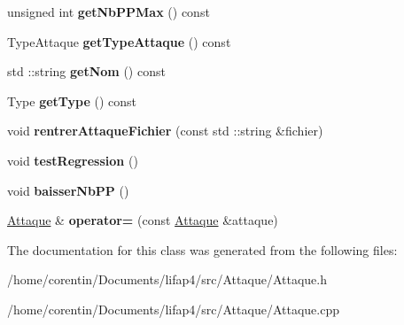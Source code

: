 \begin{DoxyCompactItemize}
unsigned int {\bfseries get\+Nb\+P\+P\+Max} () const
\item 
\mbox{\label{class_attaque_acb25c596d5b90b2330d3188749bc130d}} 
Type\+Attaque {\bfseries get\+Type\+Attaque} () const
\item 
\mbox{\label{class_attaque_a2d3e865f856f681f79934680b25ac372}} 
std \+::string {\bfseries get\+Nom} () const
\item 
\mbox{\label{class_attaque_af43d72ec9abad98f04e21e245cece692}} 
Type {\bfseries get\+Type} () const
\item 
\mbox{\label{class_attaque_ab1ddce65c74895578f145763b7ae98ef}} 
void {\bfseries rentrer\+Attaque\+Fichier} (const std \+::string \&fichier)
\item 
\mbox{\label{class_attaque_a8017dbfbf4af62e113d27d093a2786c6}} 
void {\bfseries test\+Regression} ()
\item 
\mbox{\label{class_attaque_ad6320c58f467865c778aae13c75c558f}} 
void {\bfseries baisser\+Nb\+PP} ()
\item 
\mbox{\label{class_attaque_a21b14fe41db692f8e38aa1821a3519b9}} 
\hyperlink{class_attaque}{Attaque} \& {\bfseries operator=} (const \hyperlink{class_attaque}{Attaque} \&attaque)
\end{DoxyCompactItemize}


The documentation for this class was generated from the following files\+:\begin{DoxyCompactItemize}
\item 
/home/corentin/\+Documents/lifap4/src/\+Attaque/Attaque.\+h\item 
/home/corentin/\+Documents/lifap4/src/\+Attaque/Attaque.\+cpp\end{DoxyCompactItemize}

